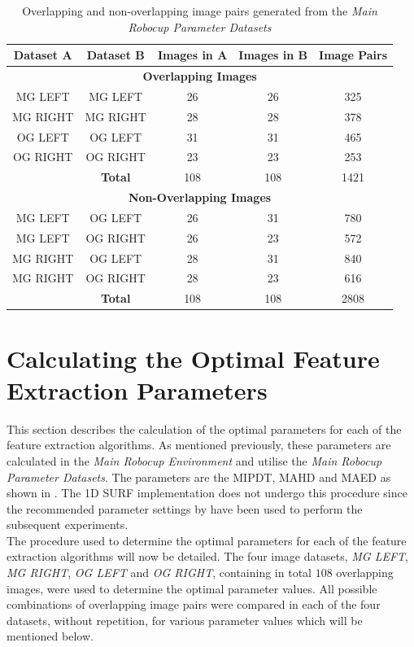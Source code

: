 \begin{table}
\centering
\caption{Overlapping and non-overlapping image pairs generated from the \textit{Main Robocup Parameter Datasets} }
\begin{tabular}{|c|c|c|c|c|}
\hline 
\textbf{Dataset A} & \textbf{Dataset B} & \textbf{Images in A} & \textbf{Images in B} & \textbf{Image Pairs}\tabularnewline
\hline 
\hline 
\multicolumn{5}{|c|}{\textbf{Overlapping Images}}\tabularnewline
\hline 
MG LEFT & MG LEFT & 26 & 26 & 325\tabularnewline
\hline 
MG RIGHT & MG RIGHT & 28 & 28 & 378\tabularnewline
\hline 
OG LEFT & OG LEFT & 31 & 31 & 465\tabularnewline
\hline 
OG RIGHT & OG RIGHT & 23 & 23 & 253\tabularnewline
\hline 
 & \textbf{Total} & 108 & 108 & 1421\tabularnewline
\hline 
\multicolumn{5}{|c|}{\textbf{Non-Overlapping Images}}\tabularnewline
\hline 
MG LEFT & OG LEFT & 26 & 31 & 780\tabularnewline
\hline 
MG LEFT & OG RIGHT & 26 & 23 & 572\tabularnewline
\hline 
MG RIGHT & OG LEFT & 28 & 31 & 840\tabularnewline
\hline 
MG RIGHT & OG RIGHT & 28 & 23 & 616\tabularnewline
\hline 
 & \textbf{Total} & 108 & 108 & 2808\tabularnewline
\hline 
\end{tabular}
\label{tab:mrpd}
\end{table}

\section{Calculating the Optimal Feature Extraction Parameters}
\label{sec:optimalParameters}
This section describes the calculation of the optimal parameters for each of the feature extraction algorithms. As mentioned previously, these parameters are calculated in the \textit{Main Robocup Environment} and utilise the \textit{Main Robocup Parameter Datasets}. The parameters are the MIPDT, MAHD and MAED as shown in . The 1D SURF implementation does not undergo this procedure since the recommended parameter settings by \citet{Anderson} have been used to perform the subsequent experiments.\\

The procedure used to determine the optimal parameters for each of the feature extraction algorithms will now be detailed. The four image datasets, \textit{MG LEFT}, \textit{MG RIGHT}, \textit{OG LEFT} and \textit{OG RIGHT}, containing in total $108$ overlapping images, were used to determine the optimal parameter values. All possible combinations of overlapping image pairs were compared in each of the four datasets, without repetition, for various parameter values which will be mentioned below. \\

